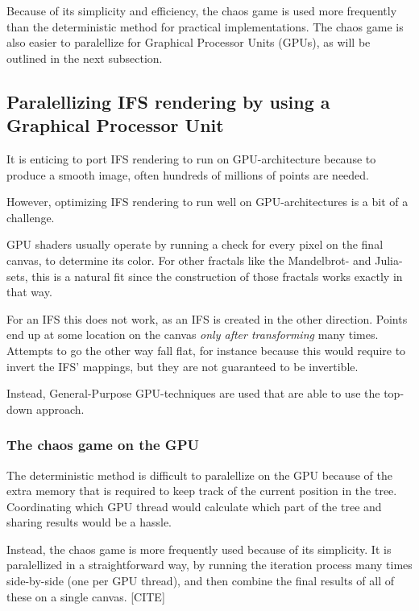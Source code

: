 \documentclass[11pt]{article}
\newcommand*{\altasterism}{\vspace*{1em plus .5em minus .5em}\noindent\hspace*{\fill}\ding{104}\hspace*{\fill}}
\begin{document}
\altasterism

Because of its simplicity and efficiency, the chaos game is used more frequently than the deterministic method for practical implementations.
The chaos game is also easier to paralellize for Graphical Processor Units (GPUs), as will be outlined in the next subsection.

\subsection{Paralellizing IFS rendering by using a Graphical Processor Unit}
\label{sec:orge2a65d9}

It is enticing to port IFS rendering to run on GPU-architecture because to produce a smooth image, often hundreds of millions of points are needed.

However, optimizing IFS rendering to run well on GPU-architectures is a bit of a challenge.

GPU shaders usually operate by running a check for every pixel on the final canvas, to determine its color.
For other fractals like the Mandelbrot- and Julia-sets, this is a natural fit since the construction of those fractals works exactly in that way.

For an IFS this does not work, as an IFS is created in the other direction. Points end up at some location on the canvas \emph{only after transforming} many times.
Attempts to go the other way fall flat, for instance because this would require to invert the IFS' mappings, but they are not guaranteed to be invertible.

Instead, General-Purpose GPU-techniques are used that are able to use the top-down approach.

\subsubsection{The chaos game on the GPU}
\label{sec:org27fb09e}
\label{subsection:chaos_game_gpu}

The deterministic method is difficult to paralellize on the GPU because of the extra memory that is required to keep track of the current position in the tree.
Coordinating which GPU thread would calculate which part of the tree and sharing results would be a hassle.

Instead, the chaos game is more frequently used because of its simplicity. It is paralellized in a straightforward way, by running the iteration process many times side-by-side (one per GPU thread),
and then combine the final results of all of these on a single canvas. [CITE]
\end{document}

